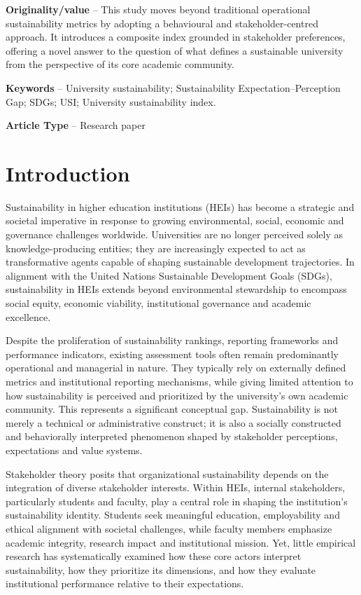 \documentclass[12pt,a4paper]{article}
\begin{document}
\textbf{Originality/value} -- This study moves beyond traditional operational sustainability metrics by adopting a behavioural and stakeholder-centred approach. It introduces a composite index grounded in stakeholder preferences, offering a novel answer to the question of what defines a sustainable university from the perspective of its core academic community.


\noindent\textbf{Keywords} -- University sustainability; Sustainability Expectation--Perception Gap; SDGs; USI; University sustainability index.

\noindent\textbf{Article Type} -- Research paper

\section{Introduction}

Sustainability in higher education institutions (HEIs) has become a strategic and societal imperative in response to growing environmental, social, economic and governance challenges worldwide. Universities are no longer perceived solely as knowledge-producing entities; they are increasingly expected to act as transformative agents capable of shaping sustainable development trajectories. In alignment with the United Nations Sustainable Development Goals (SDGs), sustainability in HEIs extends beyond environmental stewardship to encompass social equity, economic viability, institutional governance and academic excellence.

Despite the proliferation of sustainability rankings, reporting frameworks and performance indicators, existing assessment tools often remain predominantly operational and managerial in nature. They typically rely on externally defined metrics and institutional reporting mechanisms, while giving limited attention to how sustainability is perceived and prioritized by the university’s own academic community. This represents a significant conceptual gap. Sustainability is not merely a technical or administrative construct; it is also a socially constructed and behaviorally interpreted phenomenon shaped by stakeholder perceptions, expectations and value systems.

Stakeholder theory \cite{Freeman1984} posits that organizational sustainability depends on the integration of diverse stakeholder interests. Within HEIs, internal stakeholders, particularly students and faculty, play a central role in shaping the institution’s sustainability identity. Students seek meaningful education, employability and ethical alignment with societal challenges, while faculty members emphasize academic integrity, research impact and institutional mission. Yet, little empirical research has systematically examined how these core actors interpret sustainability, how they prioritize its dimensions, and how they evaluate institutional performance relative to their expectations.
\end{document}
